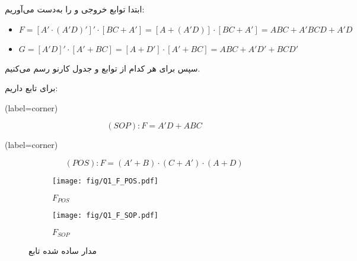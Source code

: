 ابتدا توابع خروجی  و  را به‌دست می‌آوریم:

\begin{latin}
	\begin{itemize}
		\item 
		$ F=[A'\cdot (A'D)']' \cdot [BC + A'] = [A + (A'D)] \cdot [BC + A'] = ABC + A'BCD + A'D$
		
		\item 
		$ G=[A'D]' \cdot [A' + BC] = [A + D'] \cdot [A' + BC] = ABC + A'D' + BCD' $
	\end{itemize}
\end{latin}

سپس برای هر کدام از توابع  و  جدول کارنو رسم می‌کنیم.

برای تابع  داریم:


\begin{latin}
	\begin{minipage}{0.48\textwidth}
		\centering
		\begin{karnaugh-map}[4][4][1][$B$][$A$][$D$][$C$](label=corner)
		\end{karnaugh-map}

		$$ (SOP):F=A'D + ABC $$
	\end{minipage}
	\hfill
	\begin{minipage}{0.48\textwidth}
		\centering
		\begin{karnaugh-map}[4][4][1][$B$][$A$][$D$][$C$](label=corner)
		\end{karnaugh-map}

		$$ (POS):F=(A'+B) \cdot (C+A') \cdot (A+D) $$
	\end{minipage}	
\end{latin}




\begin{figure}[h]
	\centering
	\begin{subfigure}[b]{0.3\textwidth}
		\centering
		\texttt{[image: fig/Q1\_F\_POS.pdf]}
		\caption{$F_{POS}$}
		\label{fig:F_POS}
	\end{subfigure}
	\hfil
	\begin{subfigure}[b]{0.3\textwidth}
		\centering
		\texttt{[image: fig/Q1\_F\_SOP.pdf]}
		\caption{$F_{SOP}$}
		\label{fig:F_SOP}
	\end{subfigure}
	\caption{مدار ساده شده تابع }
	\label{fig:مدار یاده شده اف}
\end{figure}




